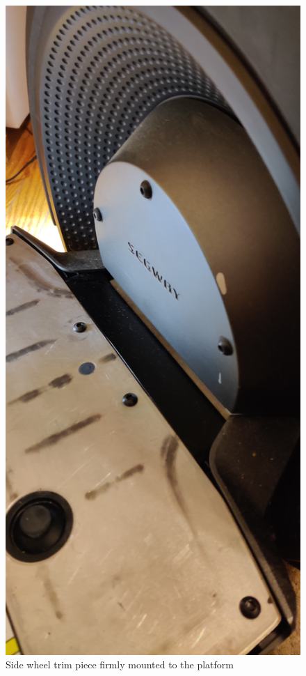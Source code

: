 \documentclass[]{formalLabReport}
\begin{document}
\begin{figure}
    \includegraphics[angle=-90]{segwayWheelAttachment.jpg}
    \caption{Side wheel trim piece firmly mounted to the platform}
    \label{fig:segwayWheelAttachment.jpg}
\end{figure}
\end{document}
